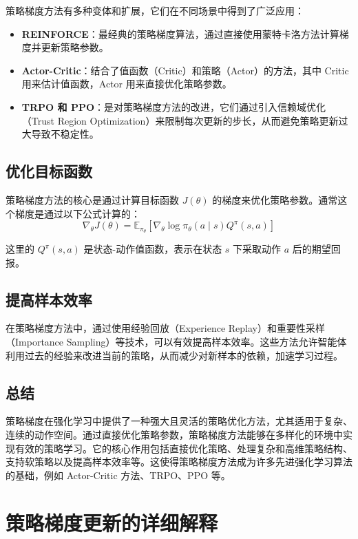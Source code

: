 \documentclass[twocolumn, 10pt]{article} %
\theoremstyle{remark}
\begin{document}
策略梯度方法有多种变体和扩展，它们在不同场景中得到了广泛应用：

\begin{itemize}
    \item \textbf{REINFORCE}：最经典的策略梯度算法，通过直接使用蒙特卡洛方法计算梯度并更新策略参数。
    \item \textbf{Actor-Critic}：结合了值函数（Critic）和策略（Actor）的方法，其中 Critic 用来估计值函数，Actor 用来直接优化策略参数。
    \item \textbf{TRPO 和 PPO}：是对策略梯度方法的改进，它们通过引入信赖域优化（Trust Region Optimization）来限制每次更新的步长，从而避免策略更新过大导致不稳定性。
\end{itemize}

\subsection{优化目标函数}

策略梯度方法的核心是通过计算目标函数 \( J(\theta) \) 的梯度来优化策略参数。通常这个梯度是通过以下公式计算的：
\[
\nabla_\theta J(\theta) = \mathbb{E}_{\pi_\theta} \left[ \nabla_\theta \log \pi_\theta(a \mid s) Q^\pi(s, a) \right]
\]

这里的 \( Q^\pi(s, a) \) 是状态-动作值函数，表示在状态 \( s \) 下采取动作 \( a \) 后的期望回报。

\subsection{提高样本效率}

在策略梯度方法中，通过使用经验回放（Experience Replay）和重要性采样（Importance Sampling）等技术，可以有效提高样本效率。这些方法允许智能体利用过去的经验来改进当前的策略，从而减少对新样本的依赖，加速学习过程。

\subsection{总结}

策略梯度在强化学习中提供了一种强大且灵活的策略优化方法，尤其适用于复杂、连续的动作空间。通过直接优化策略参数，策略梯度方法能够在多样化的环境中实现有效的策略学习。它的核心作用包括直接优化策略、处理复杂和高维策略结构、支持软策略以及提高样本效率等。这使得策略梯度方法成为许多先进强化学习算法的基础，例如 Actor-Critic 方法、TRPO、PPO 等。


\section{策略梯度更新的详细解释}
\end{document}
